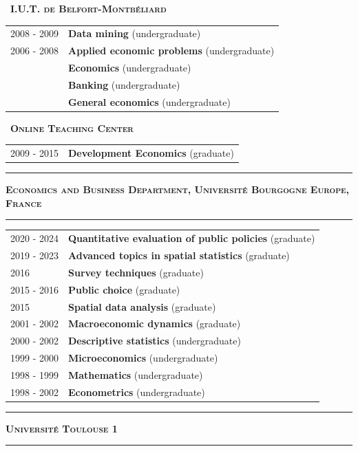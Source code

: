 \documentclass[a4paper,12pt]{article}
\newcommand{\titre}[1]{%
	\bigskip
	\noindent \rule[2mm]{\textwidth}{0.5pt}
	\textbf{\textsc{\large #1}} \\
	\noindent \rule[1mm]{\textwidth}{0.5pt}
	}
\newcommand{\smalltitre}[1]{%
	\noindent \textbullet~\textsc{\textbf{#1}}
	\smallskip
	}
\begin{document}

\smalltitre{I.U.T. de Belfort-Montbéliard}

\noindent \begin{longtable}{@{}p{\annee}p{\texte}@{}}
2008 - 2009 & \textbf{Data mining} (undergraduate) \\
2006 - 2008 & \textbf{Applied economic problems} (undergraduate) \\
		    & \textbf{Economics} (undergraduate) \\
		    & \textbf{Banking} (undergraduate) \\
		    & \textbf{General economics} (undergraduate)
\end{longtable}


\smalltitre{Online Teaching Center}

\noindent \begin{longtable}{@{}p{\annee}p{\texte}@{}}
2009 - 2015 & \textbf{Development Economics} (graduate) \\
\end{longtable}

\titre{Economics and Business Department, Université Bourgogne Europe, France}

\noindent \begin{longtable}{@{}p{\annee}p{\texte}@{}}
2020 - 2024 	& \textbf{Quantitative evaluation of public policies} (graduate) \\
2019 - 2023	& \textbf{Advanced topics in spatial statistics} (graduate) \\
2016  		& \textbf{Survey techniques} (graduate) \\
2015 - 2016	& \textbf{Public choice} (graduate) \\
2015		& \textbf{Spatial data analysis} (graduate) \\
2001 - 2002 & \textbf{Macroeconomic dynamics} (graduate) \\
2000 - 2002 & \textbf{Descriptive statistics} (undergraduate) \\
1999 - 2000 & \textbf{Microeconomics} (undergraduate) \\
1998 - 1999 & \textbf{Mathematics} (undergraduate) \\
1998 - 2002 & \textbf{Econometrics} (undergraduate)
\end{longtable}


\titre{Université Toulouse 1}
\end{document}
